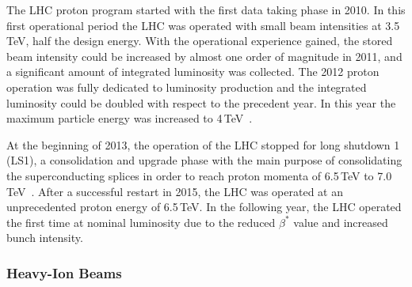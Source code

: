 The LHC proton program started with the first data taking phase in 2010. In this first operational period the LHC was operated with small beam intensities at 3.5\,TeV, half the design energy. With the operational experience gained, the stored beam intensity could be increased by almost one order of magnitude in 2011, and a significant amount of integrated luminosity was collected. The 2012 proton operation was fully dedicated to luminosity production and the integrated luminosity could be doubled with respect to the precedent year. In this year the maximum  particle energy was increased to 4\,TeV~\cite{IPAC16:WEOCA01}.

At the beginning of 2013, the operation of the LHC stopped for long shutdown 1 (LS1), a consolidation and upgrade phase with the main purpose of consolidating the superconducting splices in order to reach proton momenta of 6.5\,TeV to 7.0\,TeV~\cite{IPAC13:MOZB202}.
After a successful restart in 2015, the LHC was operated at an unprecedented proton energy of 6.5\,TeV. In the following year, the LHC operated the first time at nominal luminosity due to the reduced $\beta^*$ value and increased bunch intensity.



\subsubsection{Heavy-Ion Beams}


